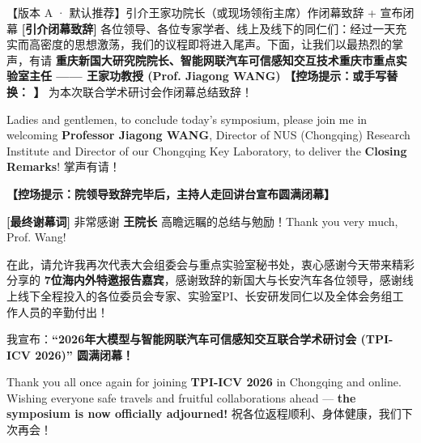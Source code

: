 \documentclass[12pt,a4paper]{article}
\newcommand{\cue}[1]{%
  {\fontsize{9.6}{12.5}\selectfont\textcolor{nusorange}{\textbf{【控场提示：#1】}}}%
}
\newcommand{\blankline}[1]{%
  \underline{\hspace{#1}}%
}
\begin{document}
\begin{scriptbox}{【版本 A · 默认推荐】引介王家功院长（或现场领衔主席）作闭幕致辞 + 宣布闭幕}
\fontsize{11.4}{16.4}\selectfont
\textbf{[引介闭幕致辞]} 各位领导、各位专家学者、线上及线下的同仁们：经过一天充实而高密度的思想激荡，我们的议程即将进入尾声。下面，让我们以最热烈的掌声，有请 \textbf{重庆新国大研究院院长、智能网联汽车可信感知交互技术重庆市重点实验室主任 —— 王家功教授 (Prof. Jiagong WANG)} \cue{或手写替换：\blankline{30mm}} 为本次联合学术研讨会作闭幕总结致辞！\par
Ladies and gentlemen, to conclude today's symposium, please join me in welcoming \textbf{Professor Jiagong WANG}, Director of NUS (Chongqing) Research Institute and Director of our Chongqing Key Laboratory, to deliver the \textbf{Closing Remarks}! 掌声有请！\par
\vspace{1.2mm}
\cue{院领导致辞完毕后，主持人走回讲台宣布圆满闭幕}\par
\textbf{[最终谢幕词]} 非常感谢 \textbf{王院长} 高瞻远瞩的总结与勉励！Thank you very much, Prof. Wang!\par
在此，请允许我再次代表大会组委会与重点实验室秘书处，衷心感谢今天带来精彩分享的 \textbf{7位海内外特邀报告嘉宾}，感谢致辞的新国大与长安汽车各位领导，感谢线上线下全程投入的各位委员会专家、实验室PI、长安研发同仁以及全体会务组工作人员的辛勤付出！\par
我宣布：\textbf{“2026年大模型与智能网联汽车可信感知交互联合学术研讨会 (TPI-ICV 2026)” 圆满闭幕！}\par
Thank you all once again for joining \textbf{TPI-ICV 2026} in Chongqing and online. Wishing everyone safe travels and fruitful collaborations ahead — \textbf{the symposium is now officially adjourned!} 祝各位返程顺利、身体健康，我们下次再会！
\end{scriptbox}
\end{document}
